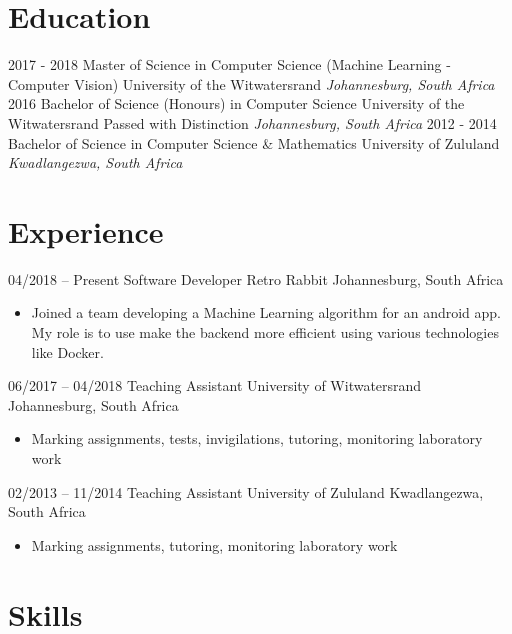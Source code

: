 \documentclass[letterpaper]{moderncv}        %
\begin{document}
\makecvtitle

%

\section{Education}
\cventry
{2017 - 2018}
{Master of Science in Computer Science (Machine Learning - Computer Vision)}
{University of the Witwatersrand}
{}
{\textit{Johannesburg, South Africa}}
{}
\cventry
{2016}
{Bachelor of Science (Honours) in Computer Science}
{University of the Witwatersrand}
{Passed with Distinction}
{\textit{Johannesburg, South Africa}}
{}
\cventry
{2012 - 2014}
{Bachelor of Science in Computer Science \& Mathematics}
{University of Zululand}
{}
{\textit{Kwadlangezwa, South Africa}}
{}
\section{Experience}
\cventry
{04/2018 -- Present}
{Software Developer}
{Retro Rabbit}
{Johannesburg, South Africa}
{}
{\begin{itemize}%
		\item Joined a team developing a Machine Learning algorithm for an android app. My role is to use make the backend more efficient using various technologies like Docker. 
	\end{itemize}}
\cventry
{06/2017 -- 04/2018}
{Teaching Assistant}
{University of Witwatersrand}
{Johannesburg, South Africa}
{}
{\begin{itemize}%
	\item Marking assignments, tests, invigilations, tutoring, monitoring laboratory work
	\end{itemize}}
\cventry
{02/2013 -- 11/2014}
{Teaching Assistant}
{University of Zululand}
{Kwadlangezwa, South Africa}
{}
{\begin{itemize}%
	\item Marking assignments, tutoring, monitoring laboratory work
	\end{itemize}}
\section{Skills}
\end{document}
